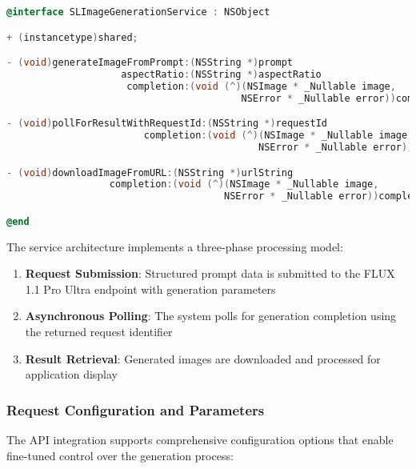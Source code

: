 \begin{lstlisting}[language=C,basicstyle=\footnotesize\ttfamily,frame=single,breaklines=true,columns=flexible,caption={FLUX 1.1 Pro Ultra API Service Implementation},label={lst:flux_api_service}]
@interface SLImageGenerationService : NSObject

+ (instancetype)shared;

- (void)generateImageFromPrompt:(NSString *)prompt
                    aspectRatio:(NSString *)aspectRatio
                     completion:(void (^)(NSImage * _Nullable image, 
                                         NSError * _Nullable error))completion;

- (void)pollForResultWithRequestId:(NSString *)requestId
                        completion:(void (^)(NSImage * _Nullable image, 
                                            NSError * _Nullable error))completion;

- (void)downloadImageFromURL:(NSString *)urlString
                  completion:(void (^)(NSImage * _Nullable image, 
                                      NSError * _Nullable error))completion;

@end
\end{lstlisting}

The service architecture implements a three-phase processing model:

\begin{enumerate}
    \item \textbf{Request Submission}: Structured prompt data is submitted to the FLUX 1.1 Pro Ultra endpoint with generation parameters
    \item \textbf{Asynchronous Polling}: The system polls for generation completion using the returned request identifier
    \item \textbf{Result Retrieval}: Generated images are downloaded and processed for application display
\end{enumerate}

\subsubsection{Request Configuration and Parameters}

The API integration supports comprehensive configuration options that enable fine-tuned control over the generation process:

